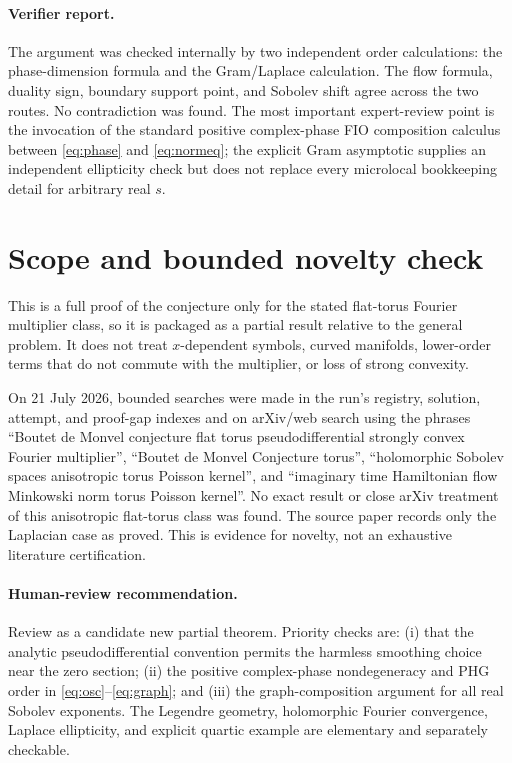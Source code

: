 \documentclass[11pt]{article}
\theoremstyle{remark}
\begin{document}
\paragraph{Verifier report.}
The argument was checked internally by two independent order calculations:
the phase-dimension formula and the Gram/Laplace calculation.  The flow formula,
duality sign, boundary support point, and Sobolev shift agree across the two
routes.  No contradiction was found.  The most important expert-review point
is the invocation of the standard positive complex-phase FIO composition
calculus between \eqref{eq:phase} and \eqref{eq:normeq}; the explicit Gram
asymptotic supplies an independent ellipticity check but does not replace every
microlocal bookkeeping detail for arbitrary real $s$.

\section{Scope and bounded novelty check}

This is a full proof of the conjecture only for the stated flat-torus Fourier
multiplier class, so it is packaged as a partial result relative to the general
problem.  It does not treat $x$-dependent symbols, curved manifolds, lower-order
terms that do not commute with the multiplier, or loss of strong convexity.

On 21 July 2026, bounded searches were made in the run's registry, solution,
attempt, and proof-gap indexes and on arXiv/web search using the phrases
``Boutet de Monvel conjecture flat torus pseudodifferential strongly convex
Fourier multiplier'', ``Boutet de Monvel Conjecture torus'', ``holomorphic
Sobolev spaces anisotropic torus Poisson kernel'', and ``imaginary time
Hamiltonian flow Minkowski norm torus Poisson kernel''.  No exact result or
close arXiv treatment of this anisotropic flat-torus class was found.  The
source paper records only the Laplacian case as proved.  This is evidence for
novelty, not an exhaustive literature certification.

\paragraph{Human-review recommendation.}
Review as a candidate new partial theorem.  Priority checks are: (i) that the
analytic pseudodifferential convention permits the harmless smoothing choice
near the zero section; (ii) the positive complex-phase nondegeneracy and PHG
order in \eqref{eq:osc}--\eqref{eq:graph}; and (iii) the graph-composition
argument for all real Sobolev exponents.  The Legendre geometry, holomorphic
Fourier convergence, Laplace ellipticity, and explicit quartic example are
elementary and separately checkable.
\end{document}
